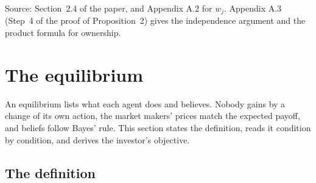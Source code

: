 {\small\color{notegrey}Source: Section~2.4 of the paper, and Appendix A.2 for \(w_j\). Appendix A.3 (Step~4 of the proof of Proposition~2) gives the independence argument and the product formula for ownership.}

\section{The equilibrium}\label{sec:model-equilibrium}

An equilibrium lists what each agent does and believes.
Nobody gains by a change of its own action, the market makers' prices match the expected payoff, and beliefs follow Bayes' rule.
This section states the definition, reads it condition by condition, and derives the investor's objective.

\subsection*{The definition}

